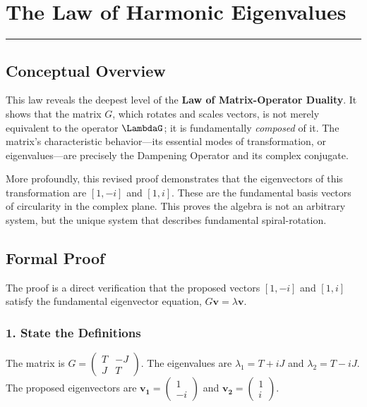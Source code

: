 
\section{The Law of Harmonic Eigenvalues}
\label{sec:harmonic_eigenvalues}
\hrule
\vspace{1em}


\subsection*{Conceptual Overview}
This law reveals the deepest level of the \textbf{Law of Matrix-Operator Duality}. It shows that the matrix $G$, which rotates and scales vectors, is not merely equivalent to the operator $\LambdaG$; it is fundamentally \textit{composed} of it. The matrix's characteristic behavior—its essential modes of transformation, or eigenvalues—are precisely the Dampening Operator and its complex conjugate.

More profoundly, this revised proof demonstrates that the eigenvectors of this transformation are $[1, -i]$ and $[1, i]$. These are the fundamental basis vectors of circularity in the complex plane. This proves the algebra is not an arbitrary system, but the unique system that describes fundamental spiral-rotation.

\subsection*{Formal Proof}
The proof is a direct verification that the proposed vectors $[1, -i]$ and $[1, i]$ satisfy the fundamental eigenvector equation, $G\mathbf{v} = \lambda\mathbf{v}$.

\subsubsection*{1. State the Definitions}
The matrix is $G = \begin{pmatrix} T & -J \\ J & T \end{pmatrix}$. The eigenvalues are $\lambda_1 = T+iJ$ and $\lambda_2 = T-iJ$. The proposed eigenvectors are $\mathbf{v_1} = \begin{pmatrix} 1 \\ -i \end{pmatrix}$ and $\mathbf{v_2} = \begin{pmatrix} 1 \\ i \end{pmatrix}$.

